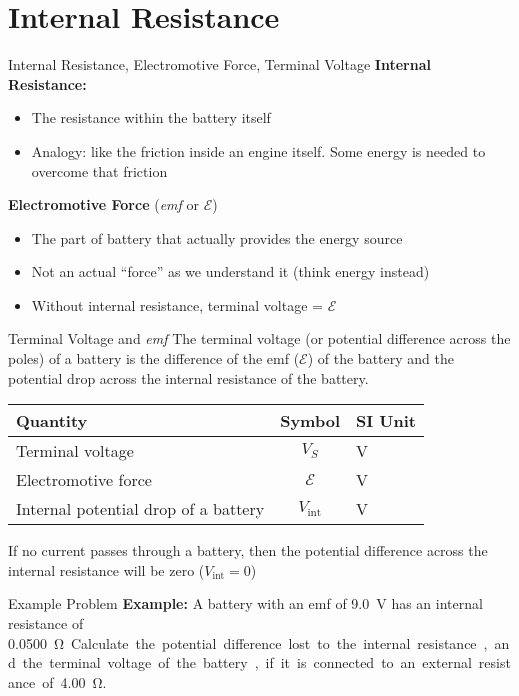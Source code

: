 \documentclass[12pt,aspectratio=169]{beamer}
\begin{document}
\section{Internal Resistance}

\begin{frame}{Internal Resistance, Electromotive Force, Terminal Voltage}
  \textbf{Internal Resistance:}
  \begin{itemize}
  \item The resistance within the battery itself
  \item Analogy: like the friction inside an engine itself. Some energy is
    needed to overcome that friction
  \end{itemize}
  \textbf{Electromotive Force} (\emph{emf} or $\mathcal{E}$)
  \begin{itemize}
  \item The part of battery that actually provides the energy source
  \item Not an actual ``force'' as we understand it (think energy instead)
  \item Without internal resistance, terminal voltage = $\mathcal E$
  \end{itemize}
\end{frame}



\begin{frame}{Terminal Voltage and \emph{emf}}
  The terminal voltage (or potential difference across the poles) of a battery
  is the difference of the emf ($\mathcal{E}$) of the battery and the potential
  drop across the internal resistance of the battery.

  \begin{center}
    \begin{tabular}{l|c|l}
      \rowcolor{pink}
      \textbf{Quantity} & \textbf{Symbol} & \textbf{SI Unit} \\ \hline
      Terminal voltage & $V_S$ & \si\volt \\
      Electromotive force & $\mathcal E$ & \si\volt \\
      Internal potential drop of a battery & $V_\text{int}$ & \si\volt
    \end{tabular}
  \end{center}
  If no current passes through a battery, then the potential difference across
  the internal resistance will be zero ($V_\text{int}=0$)
\end{frame}



\begin{frame}{Example Problem}
  \textbf{Example:} A battery with an emf of \SI{9.0}{\volt} has an internal
  resistance of \SI{.0500}\ohm. Calculate the potential difference lost to the
  internal resistance, and the terminal voltage of the battery, if it is
  connected to an external resistance of \SI{4.00}\ohm.
\end{frame}
\end{document}
